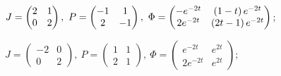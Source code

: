 \begin{enumsolsfull}
		\item \( J = \begin{pmatrix} 2 & 1 \\ 0 & 2 \end{pmatrix}, ~ P = \begin{pmatrix} -1 & 1 \\ 2 & -1 \end{pmatrix}, ~ \Phi = \begin{pmatrix} -e^{-2t} & \left( 1 - t \right) e^{-2t} \\ 2e^{-2t} & \left( 2t - 1 \right) e^{-2t} \end{pmatrix} \); %
		\item \( J = \begin{pmatrix} -2 & 0 \\ 0 & 2 \end{pmatrix}, ~ P = \begin{pmatrix} 1 & 1 \\ 2 & 1 \end{pmatrix}, ~ \Phi = \begin{pmatrix} e^{-2t} & e^{2t} \\ 2e^{-2t} & e^{2t} \end{pmatrix} \); %

\end{enumsolsfull}
